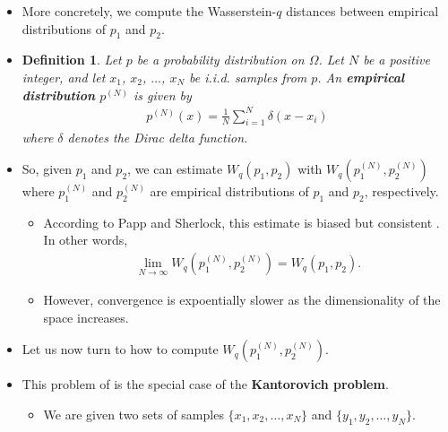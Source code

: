 \documentclass[10pt]{article}
\newtheorem{definition}[lemma]{Definition}
\newcommand{\ra}{\rightarrow}
\begin{document}
\begin{itemize}
    \item More concretely, we compute the Wasserstein-$q$ distances between empirical distributions of $p_1$ and $p_2$.

    \item \begin{definition}
        Let $p$ be a probability distribution on $\Omega$. Let $N$ be a positive integer, and let $x_1$, $x_2$, $\dotsc$, $x_N$ be i.i.d. samples from $p$. An {\bf empirical distribution} $p^{(N)}$ is given by
        \begin{align*}
            p^{(N)}(x) = \frac{1}{N} \sum_{i=1}^N \delta(x - x_i)
        \end{align*}
        where $\delta$ denotes the Dirac delta function.        
    \end{definition}

    \item So, given $p_1$ and $p_2$, we can estimate $W_q(p_1, p_2)$ with $W_q(p^{(N)}_1, p^{(N)}_2)$ where $p^{(N)}_1$ and $p^{(N)}_2$ are empirical distributions of $p_1$ and $p_2$, respectively.

    \begin{itemize}
        \item According to Papp and Sherlock, this estimate is biased but consistent  \cite{Papp:2022}. In other words,
        \begin{align*}
            \lim_{N \ra \infty} W_q(p^{(N)}_1, p^{(N)}_2) = W_q(p_1, p_2).
        \end{align*}

        \item However, convergence is expoentially slower as the dimensionality of the space increases.        
    \end{itemize}    

    \item Let us now turn to how to compute $W_q(p^{(N)}_1, p^{(N)}_2)$. 
    
    \item This problem of is the special case of the {\bf Kantorovich problem}.
    
    \begin{itemize}
        \item We are given two sets of samples $\{ x_1, x_2, \dotsc, x_N \}$ and $\{ y_1, y_2, \dotsc, y_N \}$.
        

\end{itemize}
\end{itemize}
\end{document}
